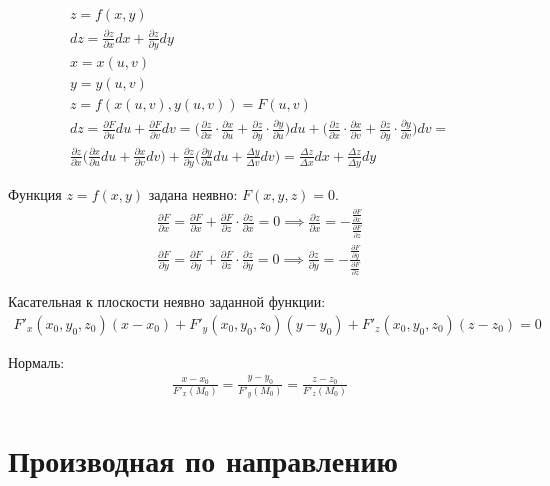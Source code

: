 \documentclass[a4paper,12pt,oneside]{extbook}
\theoremstyle{numbered}
\theoremstyle{unnumbered}
\theoremstyle{named}
\theoremstyle{unnumbered}
\theoremstyle{named}
\theoremstyle{named}
\theoremstyle{named}
\begin{document}
\begin{gather*}
    z = f(x, y) \\
    dz = \frac{\partial z}{\partial x} dx + \frac{\partial z}{\partial y} dy \\
    x = x(u, v) \\
    y = y(u, v) \\
    z = f(x(u, v), y(u, v)) = F(u, v) \\
    dz = \frac{\partial F}{\partial u} du + \frac{\partial F}{\partial v} dv =
    \Big( \frac{\partial z}{\partial x} \cdot \frac{\partial x}{\partial u} + \frac{\partial z}{\partial y} \cdot \frac{\partial y}{\partial u} \Big) du + \Big( \frac{\partial z}{\partial x} \cdot \frac{\partial x}{\partial v} + \frac{\partial z}{\partial y} \cdot \frac{\partial y}{\partial v} \Big) dv = \\
    \frac{\partial z}{\partial x} \Big( \frac{\partial x}{\partial u}du + \frac{\partial x}{\partial v}dv \Big) + \frac{\partial z}{\partial y} \Big( \frac{\partial y}{\partial u}du + \frac{\Delta y}{\Delta v}dv \Big) =
    \frac{\Delta z}{\Delta x} dx + \frac{\Delta z}{\Delta y} dy
\end{gather*}

Функция \(z = f(x, y)\) задана неявно: \(F(x, y, z) = 0\).
\begin{gather*}
    \frac{\partial F}{\partial x} = \frac{\partial F}{\partial x} + \frac{\partial F}{\partial z} \cdot \frac{\partial z}{\partial x} = 0 \implies \frac{\partial z}{\partial x} = - \frac{\frac{\partial F}{\partial x}}{\frac{\partial F}{\partial z}} \\
    \frac{\partial F}{\partial y} = \frac{\partial F}{\partial y} + \frac{\partial F}{\partial z} \cdot \frac{\partial z}{\partial y} = 0 \implies \frac{\partial z}{\partial y} = - \frac{\frac{\partial F}{\partial y}}{\frac{\partial F}{\partial z}}
\end{gather*}

Касательная к плоскости неявно заданной функции:
\begin{gather*}
    F'_x(x_0, y_0, z_0)(x - x_0) + F'_y(x_0, y_0, z_0)(y - y_0) + F'_z(x_0, y_0, z_0)(z - z_0) = 0
\end{gather*}

Нормаль:
\begin{gather*}
    \frac{x - x_0}{F'_x(M_0)} = \frac{y - y_0}{F'_y(M_0)} = \frac{z - z_0}{F'_z(M_0)}
\end{gather*}

\section{Производная по направлению}%
\label{sec:Производная по направлению}
\end{document}
